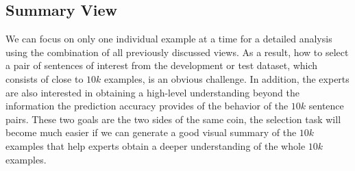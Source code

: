\subsection{Summary View}
\label{sec:allPairs}
We can focus on only one individual example at a time for a detailed analysis using the combination of all previously discussed views. As a result, how to select a pair of sentences of interest from the development or test dataset, which consists of close to $10k$ examples, is an obvious challenge.
In addition, the experts are also interested in obtaining a high-level understanding beyond the information the prediction accuracy provides of the behavior of the $10k$ sentence pairs.
%
These two goals are the two sides of the same coin, the selection task will become much easier if we can generate a good visual summary of the $10k$ examples that help experts obtain a deeper understanding of the whole $10k$ examples.

